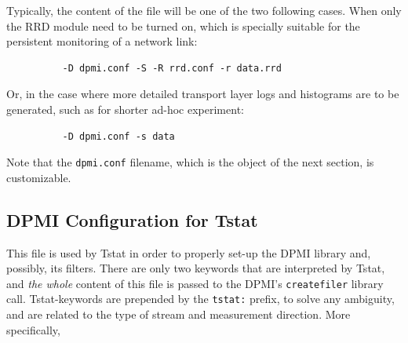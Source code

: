 \documentclass[11pt]{article}
\begin{document}
Typically, the content of the file will be one of the two following
cases. When only the RRD module need to be turned on, which is 
specially suitable for the persistent monitoring of a network link:

\begin{small}\begin{verbatim}
          -D dpmi.conf -S -R rrd.conf -r data.rrd
\end{verbatim}\end{small} \noindent
Or, in the case where more detailed transport layer logs and histograms 
are to be generated, such as for shorter ad-hoc experiment:

\begin{small}\begin{verbatim}
          -D dpmi.conf -s data
\end{verbatim}\end{small} \noindent
Note that the \texttt{dpmi.conf} filename, which is the object of the next 
section, is customizable.

\subsection{DPMI Configuration for Tstat\label{DPMI_Configuration_for_Tstat}}


This file is used by Tstat in order to properly set-up the 
DPMI library and, possibly, its filters. There are only two
keywords that are interpreted by Tstat, and \textit{the whole} 
content of this file is passed to the DPMI's \texttt{createfiler}
library call.
Tstat-keywords are prepended by the \texttt{tstat:} prefix, to 
solve any ambiguity, and are related to the type of stream
and measurement direction.
More specifically,
\end{document}
